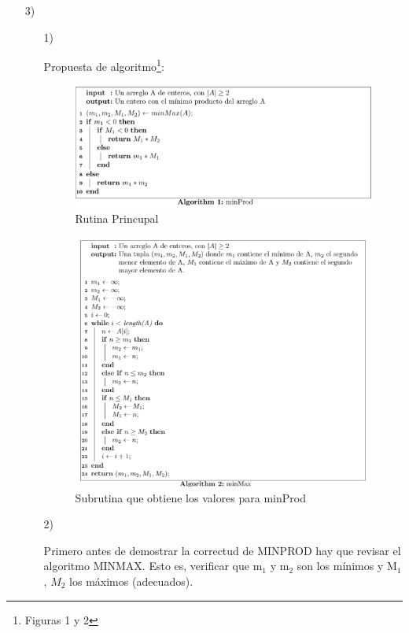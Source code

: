 \documentclass[a4paper, 12pt]{report}
\begin{document}
\begin{enumerate}
{\begin{enumerate}
\end{enumerate}
}
\item[3)]{
\begin{enumerate}
    \item[1)]{
        Propuesta de algoritmo\footnote{Figuras 1 y 2}:\\
        \begin{figure}[h!]
            \caption{Rutina Princupal}
            \centering
            \includegraphics[width=\textwidth]{images/minProd.png}
        \end{figure}
        \begin{figure}[h!]
            \caption{Subrutina que obtiene los valores para minProd}
            \centering
            \includegraphics[width=\textwidth]{images/minMax2.png}
        \end{figure}


    }
    \item[2)]{Primero antes de demostrar la correctud de MINPROD
    hay que revisar el algoritmo MINMAX. Esto es, verificar que
    m$_1$ y m$_2$ son los mínimos y M$_1$, $M_2$ los máximos (adecuados).
    
}
\end{enumerate}}
\end{enumerate}
\end{document}
